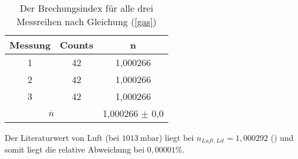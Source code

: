  \begin{table}
 \label{test2}
 \centering
 \begin{tabular}{c|c|c}
\label{test2}
 Messung	&	Counts	&	n	 \\

 \hline
1	&	42	&	1,000266 \\
2	&	42	&	1,000266 \\
3	&	42	&	1,000266  \\
\hline

 \multicolumn{2}{c}{$\overline{n}$} &1,000266 $\pm$ 0,0 \\
\hline
 \end{tabular}
 \caption{Der Brechungsindex für alle drei Messreihen nach Gleichung (\ref{gas})}
 \end{table}

Der Literaturwert von Luft (bei $\SI{1013}{\milli \bar}$) liegt bei $n_{Luft, Lit}=1,000292$ (\cite{luft}) und somit liegt die relative Abweichung bei $0,00001 \%$.
